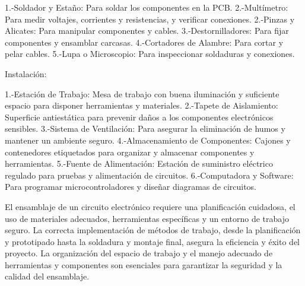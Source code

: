     1.-Soldador y Estaño: Para soldar los componentes en la PCB.
    2.-Multímetro: Para medir voltajes, corrientes y resistencias, y verificar conexiones.
    2.-Pinzas y Alicates: Para manipular componentes y cables.
    3.-Destornilladores: Para fijar componentes y ensamblar carcasas.
    4.-Cortadores de Alambre: Para cortar y pelar cables.
    5.-Lupa o Microscopio: Para inspeccionar soldaduras y conexiones.
    
    Instalación:
    
    1.-Estación de Trabajo: Mesa de trabajo con buena iluminación y suficiente espacio para disponer herramientas y materiales.
    2.-Tapete de Aislamiento: Superficie antiestática para prevenir daños a los componentes electrónicos sensibles.
    3.-Sistema de Ventilación: Para asegurar la eliminación de humos y mantener un ambiente seguro.
    4.-Almacenamiento de Componentes: Cajones y contenedores etiquetados para organizar y almacenar componentes y herramientas.
    5.-Fuente de Alimentación: Estación de suministro eléctrico regulado para pruebas y alimentación de circuitos.
    6.-Computadora y Software: Para programar microcontroladores y diseñar diagramas de circuitos.
    
    El ensamblaje de un circuito electrónico requiere una planificación cuidadosa, el uso de materiales adecuados, herramientas específicas y un entorno de trabajo seguro. La correcta implementación de métodos de trabajo, desde la planificación y prototipado hasta la soldadura y montaje final, asegura la eficiencia y éxito del proyecto. La organización del espacio de trabajo y el manejo adecuado de herramientas y componentes son esenciales para garantizar la seguridad y la calidad del ensamblaje.
    
